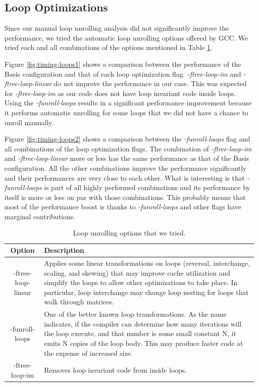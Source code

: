 \documentclass{article}
\begin{document}
\subsection{Loop Optimizations}

Since our manual loop unrolling analysis did not significantly improve the performance, we tried the automatic loop unrolling options offered by GCC. We tried each and all combinations of the options mentioned in Table \ref{loop-unrolling}. 

Figure \ref{fig:timing-loops1} shows a comparison between the performance of the Basis configuration and that of each loop optimization flag. \textit{-ftree-loop-im} and \textit{-ftree-loop-linear} do not improve the performance in our case. This was expected for  \textit{-ftree-loop-im} as our code does not have loop invariant code inside loops. Using the \textit{-funroll-loops} results in a significant performance improvement because it performs automatic unrolling for some loops that we did not have a chance to unroll manually. 

Figure \ref{fig:timing-loops2} shows a comparison between the \textit{-funroll-loops} flag and all combinations of the loop optimization flags. The combination of \textit{-ftree-loop-im} and \textit{-ftree-loop-linear} more or less has the same performance as that of the Basis configuration. All the other combinations improve the performance significantly and their performances are very close to each other. What is interesting is that \textit{-funroll-loops} is part of all highly performed combinations and its performance by itself is more or less on par with those combinations. This probably means that most of the performance boost is thanks to \textit{-funroll-loops} and other flags have marginal contributions.


\begin{table}
\begin{center}
    \begin{tabular}{ | c | p{10cm} |}
    \hline
    Option & Description \\ \hline
    -ftree-loop-linear  & Applies some linear transformations on loops (reversal, interchange, scaling, and skewing) that may improve cache utilization and simplify the loops to allow other optimizations to take place. In particular, loop interchange may change loop nesting for loops that walk through matrices. \\ \hline
    -funroll-loops &  One of the better known loop transformations. As the name indicates, if the compiler can determine how many iterations will the loop execute, and that number is some small constant N, it emits N copies of the loop body. This may produce faster code at the expense of increased size. \\
    \hline
    -ftree-loop-im & Removes loop invariant code from inside loops. \\ \hline
    \end{tabular}
    \caption{Loop unrolling options that we tried.}
    \label{loop-unrolling}
\end{center}
\end{table}
\end{document}
